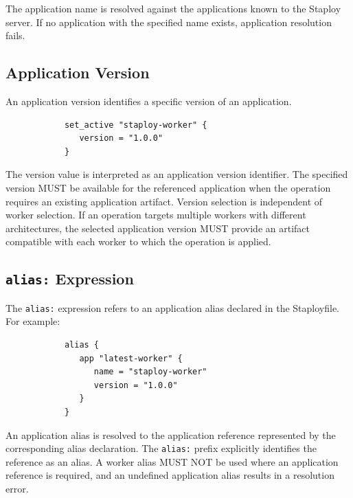 \documentclass[11pt,a4paper]{article}
\begin{document}
    The application name is resolved against the applications known to the Staploy server.
    If no application with the specified name exists, application resolution fails.

    \subsection{Application Version}\label{subsec:application-version}

    An application version identifies a specific version of an application.

    \begin{center}
        \begin{verbatim}
            set_active "staploy-worker" {
               version = "1.0.0"
            }
        \end{verbatim}
    \end{center}

    The version value is interpreted as an application version identifier.
    The specified version MUST be available for the referenced application when the operation requires an existing application artifact.
    Version selection is independent of worker selection.
    If an operation targets multiple workers with different architectures,
    the selected application version MUST provide an artifact compatible with each worker to which the operation is applied.

    \subsection{\texttt{alias:} Expression}\label{subsec:texttt-expression2}

    The \texttt{alias:} expression refers to an application alias declared in the Staployfile.
    For example:

    \begin{center}
        \begin{verbatim}
            alias {
               app "latest-worker" {
                  name = "staploy-worker"
                  version = "1.0.0"
               }
            }
        \end{verbatim}
    \end{center}

    An application alias is resolved to the application reference represented by the corresponding alias declaration.
    The \texttt{alias:} prefix explicitly identifies the reference as an alias.
    A worker alias MUST NOT be used where an application reference is required, and an undefined application alias results in a resolution error.
\end{document}
